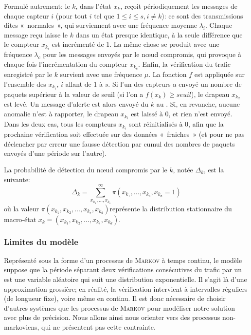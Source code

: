 Formulé autrement: le \cn $k$, dans l'état $x_k$, reçoit périodiquement les messages de chaque capteur $i$ (pour tout $i$ tel que $1\leq i\leq s, i\!\neq\!k$): ce sont des transmissions dites «~normales~», qui surviennent avec une fréquence moyenne $\lambda_i$.
Chaque message reçu laisse le \cn $k$ dans un état presque identique, à la seule différence que le compteur $x_{k_i}$ est incrémenté de $1$.
La même chose se produit avec une fréquence $\lambda_c$ pour les messages envoyés par le nœud compromis, qui provoque à chaque fois l'incrémentation du compteur $x_{k_c}$.
Enfin, la vérification du trafic enregistré par le \cn $k$ survient avec une fréquence $\mu$.
La fonction $f$ est appliquée sur l'ensemble des $x_{k_i}$, $i$ allant de $1$ à $s$.
Si l'un des capteurs a envoyé un nombre de paquets supérieur à la valeur de seuil (\cad si l'on a $f(x_k)\geq \mathit{seuil}$), le drapeau $x_{k_d}$ est levé.
Un message d'alerte est alors envoyé du \cn $k$ au \ch.
Si, en revanche, aucune anomalie n'est à rapporter, le drapeau $x_{k_i}$ est laissé à $0$, et rien n'est envoyé.
Dans les deux cas, tous les compteurs $x_{k_i}$ sont réinitialisés à $0$, afin que la prochaine vérification soit effectuée sur des données «~fraiches~» (et pour ne pas déclencher par erreur une fausse détection par cumul des nombres de paquets envoyés d'une période sur l'autre).

La probabilité de détection du nœud compromis par le \cn $k$, notée $\Delta_k$, est la suivante:
\[\Delta_k=\sum_{x_{k_1},\dots,x_{k_s}}^\infty\pi(x_{k_1},\dots,x_{k_s},x_{k_d}=1)\]
où la valeur \quad$\pi(x_{k_1},x_{k_2},\dots,x_{k_{s}},x_{k_d})$\quad représente la distribution stationnaire du macro-état $x_k\!=\!(x_{k_1},x_{k_2},\dots,x_{k_{s}},x_{k_d})$.

        \subsubsection{Limites du modèle}
Représenté sous la forme d'un processus de \textsc{Markov} à temps continu, le modèle suppose que la période séparant deux vérifications consécutives du trafic par un \cn est une variable aléatoire qui suit une distribution exponentielle.
Il s'agit là d'une approximation grossière; en réalité, la vérification intervient à intervalles réguliers (de longueur fixe), voire même en continu.
Il est donc nécessaire de choisir d'autres systèmes que les processus de \textsc{Markov} pour modéliser notre solution avec plus de précision.
Nous allons ainsi nous orienter vers des processus non-markoviens, qui ne présentent pas cette contrainte.

